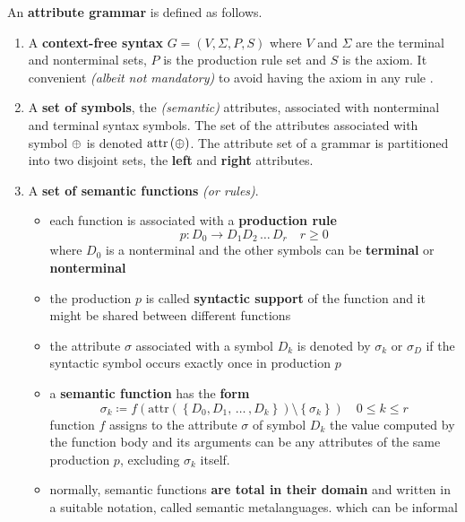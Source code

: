\documentclass[english]{article}
\begin{document}
\begin{definition}
  \label{def:attribute-grammar}
  An \textbf{attribute grammar} is defined as follows.

  \begin{enumerate}
    \item A \textbf{context-free syntax} \(G = \left( V, \Sigma, P, S \right)\) where \(V\) and \(\Sigma\) are the terminal and nonterminal sets, \(P\) is the production rule set and \(S\) is the axiom.
          It convenient \textit{(albeit not mandatory)} to avoid having the axiom in any rule \RP.
    \item A \textbf{set of symbols}, the \textit{(semantic)} attributes, associated with nonterminal and terminal syntax symbols.
          The set of the attributes associated with symbol \(\oplus\) is denoted \(\text{attr}\left( \oplus \right)\).
          The attribute set of a grammar is partitioned into two disjoint sets, the \textbf{left} and \textbf{right} attributes.
    \item A \textbf{set of semantic functions} \textit{(or rules)}.
          \begin{itemize}
            \item each function is associated with a \textbf{production rule}
                  \[ p: D_0 \rightarrow D_1 D_2 \,\ldots\, D_r \quad r \geq 0\]
                  where \(D_0\) is a nonterminal and the other symbols can be \textbf{terminal} or \textbf{nonterminal}
            \item the production \(p\) is called \textbf{syntactic support} of the function and it might be shared between different functions
            \item the attribute \(\sigma\) associated with a symbol \(D_k\) is denoted by \(\sigma_k\) or \(\sigma_D\) if the syntactic symbol occurs exactly once in production \(p\)
            \item a \textbf{semantic function} has the \textbf{form}
                  \[ \sigma_k \coloneqq f \left( \text{attr} \left( \left\{ D_0, D_1, \,\ldots\, , D_k \right\} \right) \setminus \left\{ \sigma_k \right\}\right) \quad 0 \leq k \leq r \]
                  function \(f\) assigns to the attribute \(\sigma\) of symbol \(D_k\) the value computed by the function body and its arguments can be any attributes of the same production \(p\), excluding \(\sigma_k\) itself.
            \item normally, semantic functions \textbf{are total in their domain} and written in a suitable notation, called semantic metalanguages. which can be informal

\end{itemize}
\end{enumerate}
\end{definition}
\end{document}
